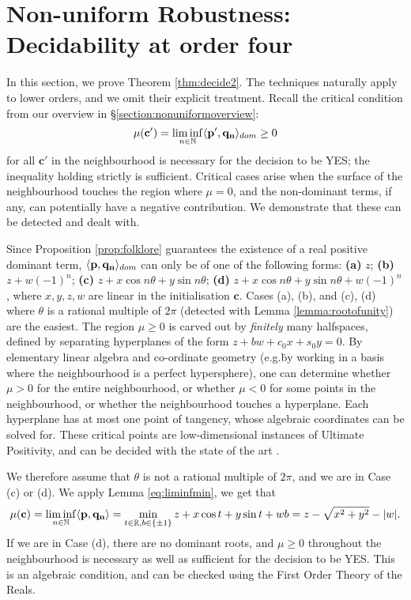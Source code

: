 \section{Non-uniform Robustness: Decidability at order four}
\label{section:decidability2}


In this section, we prove Theorem \ref{thm:decide2}. The techniques naturally apply to lower orders, and we omit their explicit treatment. Recall the critical condition from our overview in \S\ref{section:nonuniformoverview}:
\begin{equation}
\mu(\mathbf{c'}) = \liminf_{n\in \mathbb{N}}\langle\mathbf{p'}, \mathbf{q_n}\rangle_{dom} \ge 0
\end{equation}
for all $\mathbf{c'}$ in the neighbourhood is necessary for the decision to be YES; the inequality holding strictly is sufficient. Critical cases arise when the surface of the neighbourhood touches the region where $\mu = 0$, and the non-dominant terms, if any, can potentially have a negative contribution. We demonstrate that these can be detected and dealt with.

Since Proposition \ref{prop:folklore} guarantees the existence of a real positive dominant term, $\langle\mathbf{p}, \mathbf{q_n}\rangle_{dom}$ can only be of one of the following forms: {\bf(a)} $z$; {\bf(b)} $z + w(-1)^n$; {\bf(c)} $z + x\cos n\theta + y\sin n\theta$; {\bf(d)} $z + x\cos n\theta + y\sin n\theta + w(-1)^n$, where $x, y, z, w$ are linear in the initialisation $\mathbf{c}$. Cases (a), (b), and (c), (d) where $\theta$ is a rational multiple of $2\pi$ (detected with Lemma \ref{lemma:rootofunity}) are the easiest. The region $\mu \ge 0$ is carved out by \textit{finitely} many halfspaces, defined by separating hyperplanes of the form $z + bw + c_0 x + s_0 y = 0$. By elementary linear algebra and co-ordinate geometry (e.g.\. by working in a basis where the neighbourhood is a perfect hypersphere), one can determine whether $\mu > 0$ for the entire neighbourhood, or whether $\mu < 0$ for some points in the neighbourhood, or whether the neighbourhood touches a hyperplane. Each hyperplane has at most one point of tangency, whose algebraic coordinates can be solved for.  These critical points are low-dimensional instances of Ultimate Positivity, and can be decided with the state of the art \cite{ouaknine2014ultimate}.

We therefore assume that $\theta$ is not a rational multiple of $2\pi$, and we are in Case (c) or (d). We apply Lemma \ref{eq:liminfmin}, we get that 
\begin{equation}
\mu(\mathbf{c}) = \liminf_{n \in \mathbb{N}} \langle\mathbf{p}, \mathbf{q_n}\rangle = \min_{t \in \mathbb{R}, b \in \{\pm 1\}} z + x\cos t + y\sin t + wb = z - \sqrt{x^2 + y^2} - |w|.
\end{equation}
If we are in Case (d), there are no dominant roots, and $\mu \ge 0$ throughout the neighbourhood is necessary as well as sufficient for the decision to be YES. This is an algebraic condition, and can be checked using the First Order Theory of the Reals.\footnotemark


